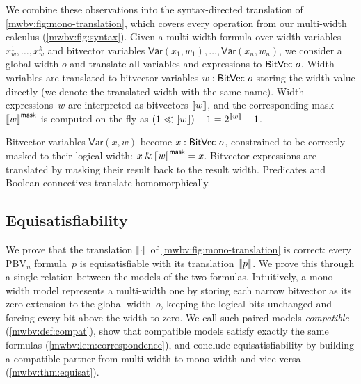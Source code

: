 
We combine these observations into the syntax-directed translation
of \cref{mwbv:fig:mono-translation}, which covers every operation
from our multi-width calculus (\cref{mwbv:fig:syntax}).
Given a multi-width formula over width variables $x_w^1, \ldots, x_w^k$ and bitvector variables
$\textsf{Var}(x_1, w_1), \ldots, \textsf{Var}(x_n, w_n)$,
we consider a global width $o$ and translate all variables and expressions to $\mathsf{BitVec}~{o}$.
Width variables are translated to bitvector variables $w : \mathsf{BitVec}~{o}$ storing the
width value directly (we denote the translated width with the same name).
%
Width expressions~$w$ are interpreted as bitvectors $\left\llbracket w \right\rrbracket$, and the
corresponding mask $\left\llbracket w \right\rrbracket^{\mathsf{mask}}$ is computed on the fly as
$(1 \ll \left\llbracket w \right\rrbracket) - 1 = 2^{\left\llbracket w \right\rrbracket} - 1$.

Bitvector variables $\textsf{Var}(x, w)$ become $x : \mathsf{BitVec}~{o}$, constrained to be
correctly masked to their logical width: $x \mathbin{\&} \left\llbracket w \right\rrbracket^{\mathsf{mask}} = x$.
%
Bitvector expressions are translated by masking their result back to the result
width. Predicates and Boolean connectives translate homomorphically.


\subsection{Equisatisfiability}\label{mwbv:sec:bounded-proof}

We prove that the translation $\left\llbracket \cdot \right\rrbracket$ of \cref{mwbv:fig:mono-translation} is correct:
every $\text{PBV}_n$ formula~$p$ is equisatisfiable with its
translation~$\left\llbracket p \right\rrbracket$. We prove this through a single relation between the
models of the two formulas. Intuitively, a mono-width model represents a
multi-width one by storing each narrow bitvector as its zero-extension to the
global width~$o$, keeping the logical bits unchanged and forcing every bit above
the width to zero. We call such paired models \emph{compatible}
(\cref{mwbv:def:compat}), show that compatible models satisfy exactly the same
formulas (\cref{mwbv:lem:correspondence}), and conclude equisatisfiability by
building a compatible partner from multi-width to mono-width and vice versa (\cref{mwbv:thm:equisat}).

